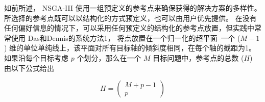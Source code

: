 如前所述， NSGA-III 使用一组预定义的参考点来确保获得的解决方案的多样性。
所选择的参考点既可以以结构化的方式预定义，也可以由用户优先提供。
在没有任何偏好信息的情况下，可以采用任何预定义的结构化的参考点放置，但实践中常常使用 Das和Dennis的\cite{das&dennis2000}系统方法1，
将点放置在一个归一化的超平面--一个 ($M-1$) 维的单位单纯线上，该平面对所有目标轴的倾斜度相同，在每个轴的截距为1。
如果沿每个目标考虑 $p$ 个划分，那么在一个 $M$ 目标问题中，参考点的总数 ($H$) 由以下公式给出

\begin{equation}\label{eq:H}
    H = \begin{pmatrix}
        M + p - 1 \\
        p
    \end{pmatrix}
\end{equation}

